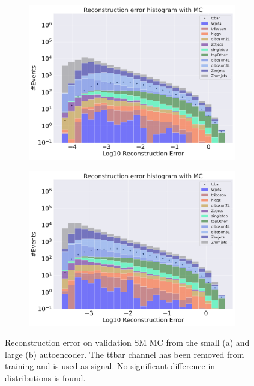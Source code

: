 \begin{figure}[!htb]
    \centering
    \begin{subfigure}{.45\textwidth}
        \includegraphics[width=\textwidth]{Figures/AE_testing/small/b_data_recon_big_rm3_feats_sig_ttbar.pdf}
        \caption{}
        \label{fig:ae_small_ttbar}
    \end{subfigure}
    \hfill 
    \begin{subfigure}{.45\textwidth}
        \includegraphics[width=\textwidth]{Figures/AE_testing/big/b_data_recon_big_rm3_feats_sig_ttbar.pdf}
        \caption{ }
        \label{fig:ae_big_ttbar}
    \end{subfigure}
    \hfill 
    \caption[AE | Reconstruction error using ttbar channel as signal]{Reconstruction error on validation SM MC from the small (a) and large (b) autoencoder. The ttbar channel has been removed from training and 
    is used as signal. No significant difference in distributions is found.  }
    \label{fig:ae_big_channel_3}
\end{figure}



